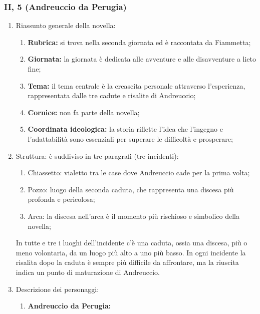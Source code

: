 \documentclass{article}
\begin{document}
\subsubsection{II, 5 (Andreuccio da Perugia)}
\begin{enumerate}
    \item Riassunto generale della novella:
        \begin{enumerate}[label*=\arabic*.]
            \item \textbf{Rubrica:} si trova nella seconda giornata ed è raccontata da
                Fiammetta;
            \item \textbf{Giornata:} la giornata è dedicata alle avventure e alle disavventure
                a lieto fine;
            \item \textbf{Tema:} il tema centrale è la creascita personale attraverso
                l'esperienza, rappresentata dalle tre cadute e risalite di Andreuccio;
            \item \textbf{Cornice:} non fa parte della novella;
            \item \textbf{Coordinata ideologica:} la storia riflette l'idea che l'ingegno e
                l'adattabilità sono essenziali per superare le difficoltà e prosperare;
        \end{enumerate}
    \item Struttura: è suddiviso in tre paragrafi (tre incidenti):
        \begin{enumerate}[label*=\arabic*.]
            \item Chiassetto: vialetto tra le case dove Andreuccio cade per la
                prima volta;
            \item Pozzo: luogo della seconda caduta, che rappresenta una discesa più
                profonda e pericolosa;
            \item Arca: la discesa nell'arca è il momento più rischioso e simbolico
                della novella;
        \end{enumerate}
        In tutte e tre i luoghi dell'incidente c'è una caduta, ossia una discesa, più o meno
        volontaria, da un luogo più alto a uno più basso. In ogni incidente la risalita dopo
        la caduta è sempre più difficile da affrontare, ma la riuscita indica un punto di
        maturazione di Andreuccio.
    \item Descrizione dei personaggi:
        \begin{enumerate}[label*=\arabic*.]
            \item \textbf{Andreuccio da Perugia:}\\

\end{enumerate}
\end{enumerate}
\end{document}
